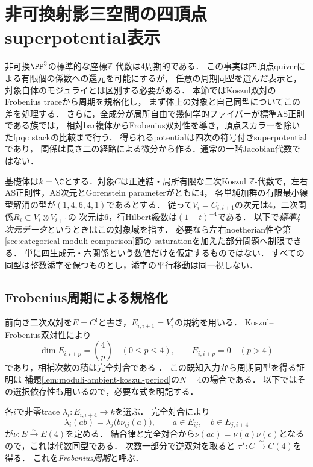 \section{非可換射影三空間の四頂点superpotential表示}
\label{sec:projective-three-potentials}

非可換$\PP^3$の標準的な座標$\mathbb Z$-代数は4周期的である．
この事実は四頂点quiverによる有限個の係数への還元を可能にするが，
任意の周期同型を選んだ表示と，対象自体のモジュライとは区別する必要がある．
本節ではKoszul双対のFrobenius traceから周期を規格化し，
まず体上の対象と自己同型についてこの差を処理する．
さらに，全成分が局所自由で幾何学的ファイバーが標準AS正則である族では，
相対bar複体からFrobenius双対性を導き，頂点スカラーを除いたfpqc stackの比較まで行う．
得られるpotentialは四次の符号付きsuperpotentialであり，
関係は長さ二の経路による微分から作る．通常の一階Jacobian代数ではない．

基礎体は$k=\C$とする．対象$C$は正連結・局所有限な二次Koszul
$\mathbb Z$-代数で，左右AS正則性，AS次元とGorenstein parameterがともに4，
各単純加群の有限最小線型解消の型が$(1,4,6,4,1)$であるとする．
従って$V_i=C_{i,i+1}$の次元は4，二次関係$R_i\subset V_i\otimes V_{i+1}$の
次元は6，行Hilbert級数は$(1-t)^{-4}$である．
以下で\emph{標準4次元データ}というときはこの対象域を指す．
必要なら左右noetherian性や第\ref{sec:categorical-moduli-comparison}節の
saturationを加えた部分問題へ制限できる．
単に四生成元・六関係という数値だけを仮定するものではない．
すべての同型は整数添字を保つものとし，添字の平行移動は同一視しない．

\subsection{Frobenius周期による規格化}

前向き二次双対を$E=C^!$と書き，$E_{i,i+1}=V_i^*$の規約を用いる．
Koszul--Frobenius双対性により
\begin{equation}\label{eq:p3-local-frobenius}
 \dim E_{i,i+p}=\binom4p\quad(0\le p\le4),\qquad
 E_{i,i+p}=0\quad(p>4)
\end{equation}
であり，相補次数の積は完全対合である
\cite[Proposition~4.1, \S5]{PBondalPolishchukHelices}．
この既知入力から周期同型を得る証明は
補題\ref{lem:moduli-ambient-koszul-period}の$N=4$の場合である．
以下ではその選択依存性も用いるので，必要な式を明記する．

各$i$で非零trace $\lambda_i:E_{i,i+4}\to k$を選ぶ．
完全対合により
\begin{equation}\label{eq:p3-frobenius-period}
 \lambda_i(ab)=\lambda_j\bigl(b\nu_{ij}(a)\bigr),
 \qquad a\in E_{ij},\quad b\in E_{j,i+4}
\end{equation}
が$\nu:E\xrightarrow{\sim}E(4)$を定める．
結合律と完全対合から$\nu(ac)=\nu(a)\nu(c)$となるので，これは代数同型である．
次数一部分で逆双対を取ると
$\tau^\lambda:C\xrightarrow{\sim}C(4)$を得る．
これを\emph{Frobenius周期}と呼ぶ．

